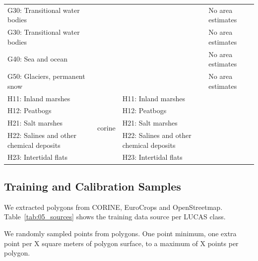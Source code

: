\begin{table}[]
\begin{tabular}{l{2cm}lll}
G30: Transitional water bodies                &                         &                                                       & No area estimates                                         \\
G30: Transitional water bodies                &                         &                                                       & No area estimates                                         \\
G40: Sea and ocean                            &                         &                                                       & No area estimates                                         \\
G50: Glaciers, permanent snow                 &                         &                                                       & No area estimates                                         \\
H11: Inland marshes                           & \multirow{5}{*}{corine} & H11: Inland marshes                                   &                                                           \\
H12: Peatbogs                                 &                         & H12: Peatbogs                                         &                                                           \\
H21: Salt marshes                             &                         & H21: Salt marshes                                     &                                                           \\
H22: Salines and other chemical deposits      &                         & H22: Salines and other chemical deposits              &                                                           \\
H23: Intertidal flats                         &                         & H23: Intertidal flats                                 &                                                          
\end{tabular}
\end{table}

\subsection{Training and Calibration Samples}
We extracted polygons from CORINE, EuroCrops and OpenStreetmap. Table~\ref{tab:05_sources} shows the training data source per LUCAS class.

We randomly sampled points from polygons. One point minimum, one extra point per X square meters of polygon surface, to a maximum of X points per polygon.


